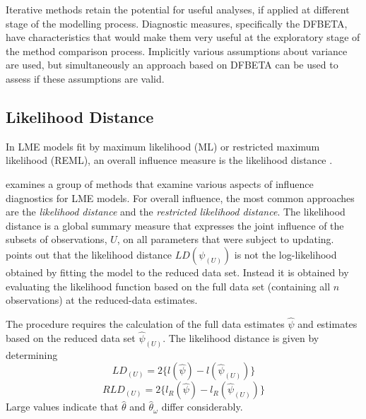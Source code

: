 \documentclass[12pt, a4paper]{report}
\theoremstyle{definition}
\theoremstyle{remark}
\begin{document}
	
	Iterative methods retain the potential for useful analyses, if applied at different stage of the modelling process. Diagnostic measures, specifically the DFBETA, have characteristics that would make them very useful at the exploratory stage of the method comparison process. Implicitly various assumptions about variance are used, but simultaneously an approach based on DFBETA can be used to assess if these assumptions are valid.
	
	


	\subsection{Likelihood Distance}
In LME models fit by
	 maximum likelihood (ML) or  restricted maximum likelihood (REML), an overall influence measure is the  likelihood distance \citep{CookWeisberg}.
	
	\citet{west} examines a group of methods that examine various aspects of influence diagnostics for LME models. For overall influence, the most common approaches are the \textit{likelihood distance} and the \textit{restricted likelihood distance}.	
	The  likelihood distance is a global summary measure that expresses the joint influence of the subsets of observations, $U$, on all parameters that were subject to updating. \citet{schabenberger} points out that the likelihood distance $LD(\psi_{(U)})$ is not the log-likelihood obtained by fitting the model to the reduced data set. Instead it is obtained by evaluating the likelihood function based on the full data set (containing all $n$ observations) at the reduced-data estimates.
	
	
	
	
	
	The
	procedure requires the calculation of the full data estimates
	$\hat{\psi}$ and estimates based on the reduced data set
	$\hat{\psi}_{(U)}$. The likelihood distance is given by
	determining
	\[
	LD_{(U)} = 2\{l(\hat{\psi}) - l( \hat{\psi}_{(U)}) \}\]\[
	RLD_{(U)} = 2\{l_{R}(\hat{\psi}) - l_{R}(\hat{\psi}_{(U)})\}
	\]
	Large values indicate that ${\hat{\theta}}$ and ${\hat{\theta}_\omega}$ differ considerably.
	
\end{document}
